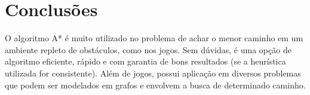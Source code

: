 \documentclass[12pt]{article}
\begin{document}
\section{Conclusões}

O algoritmo A* é muito utilizado no problema de achar o menor caminho em um ambiente repleto de obstáculos, como nos jogos. Sem dúvidas, é uma opção de algoritmo eficiente, rápido e com garantia de bons resultados (se a heurística utilizada for consistente). Além de jogos, possui aplicação em diversos problemas que podem ser modelados em grafos e envolvem a busca de determinado caminho.



\end{document}
